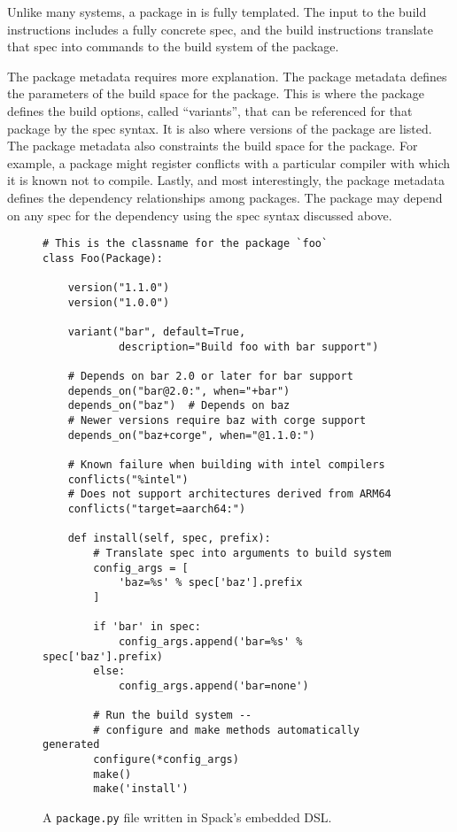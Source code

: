 Unlike many systems, a package in \spack{} is fully templated. The input to the build instructions includes a fully concrete spec, and the build instructions translate that spec into commands to the build system of the package.

The package metadata requires more explanation. The package metadata defines the parameters of the build space for the package. This is where the package defines the build options, called ``variants'', that can be referenced for that package by the spec syntax. It is also where versions of the package are listed. The package metadata also constraints the build space for the package. For example, a package might register conflicts with a particular compiler with which it is known not to compile. Lastly, and most interestingly, the package metadata defines the dependency relationships among packages. The package may depend on any spec for the dependency using the spec syntax discussed above.

\begin{figure}
\begin{verbatim}
# This is the classname for the package `foo`
class Foo(Package):

    version("1.1.0")
    version("1.0.0")

    variant("bar", default=True,
            description="Build foo with bar support")

    # Depends on bar 2.0 or later for bar support
    depends_on("bar@2.0:", when="+bar")
    depends_on("baz")  # Depends on baz
    # Newer versions require baz with corge support
    depends_on("baz+corge", when="@1.1.0:")

    # Known failure when building with intel compilers
    conflicts("%intel")
    # Does not support architectures derived from ARM64
    conflicts("target=aarch64:")

    def install(self, spec, prefix):
        # Translate spec into arguments to build system
        config_args = [
            'baz=%s' % spec['baz'].prefix
        ]

        if 'bar' in spec:
            config_args.append('bar=%s' % spec['baz'].prefix)
        else:
            config_args.append('bar=none')

        # Run the build system --
        # configure and make methods automatically generated
        configure(*config_args)
        make()
        make('install')
\end{verbatim}
\caption{
  A {\tt package.py} file written in Spack's embedded DSL.
  \label{fig:example-spack-package}
}
\end{figure}

